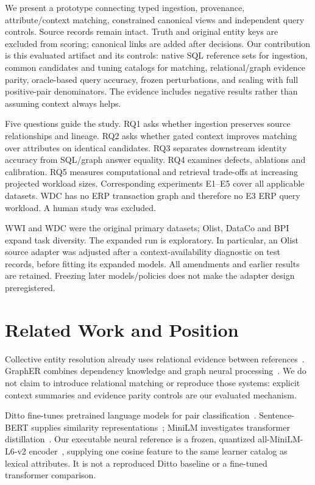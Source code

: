 \documentclass[conference,letterpaper]{IEEEtran}
\begin{document}
We present a prototype connecting typed ingestion, provenance, attribute/context matching, constrained canonical views and independent query controls. Source records remain intact. Truth and original entity keys are excluded from scoring; canonical links are added after decisions. Our contribution is this evaluated artifact and its controls: native SQL reference sets for ingestion, common candidates and tuning catalogs for matching, relational/graph evidence parity, oracle-based query accuracy, frozen perturbations, and scaling with full positive-pair denominators. The evidence includes negative results rather than assuming context always helps.

Five questions guide the study. RQ1 asks whether ingestion preserves source relationships and lineage. RQ2 asks whether gated context improves matching over attributes on identical candidates. RQ3 separates downstream identity accuracy from SQL/graph answer equality. RQ4 examines defects, ablations and calibration. RQ5 measures computational and retrieval trade-offs at increasing projected workload sizes. Corresponding experiments E1--E5 cover all applicable datasets. WDC has no ERP transaction graph and therefore no E3 ERP query workload. A human study was excluded.

WWI and WDC were the original primary datasets; Olist, DataCo and BPI expand task diversity. The expanded run is exploratory. In particular, an Olist source adapter was adjusted after a context-availability diagnostic on test records, before fitting its expanded models. All amendments and earlier results are retained. Freezing later models/policies does not make the adapter design preregistered.

\section{Related Work and Position}
Collective entity resolution already uses relational evidence between references~\cite{collective}. GraphER combines dependency knowledge and graph neural processing~\cite{grapher}. We do not claim to introduce relational matching or reproduce those systems: explicit context summaries and evidence parity controls are our evaluated mechanism.

Ditto fine-tunes pretrained language models for pair classification~\cite{ditto}. Sentence-BERT supplies similarity representations~\cite{sbert}; MiniLM investigates transformer distillation~\cite{minilm}. Our executable neural reference is a frozen, quantized all-MiniLM-L6-v2 encoder~\cite{modelcard}, supplying one cosine feature to the same learner catalog as lexical attributes. It is not a reproduced Ditto baseline or a fine-tuned transformer comparison.
\end{document}
